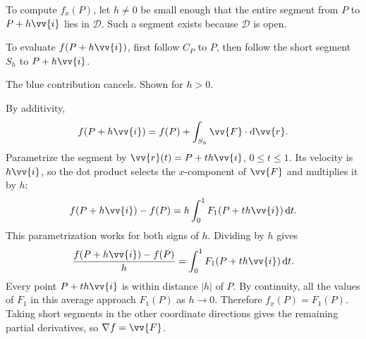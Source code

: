 \newpage
\noindent\begin{minipage}[c]{0.62\linewidth}
To compute $f_x(P)$, let $h \ne 0$ be small enough that the entire segment
from $P$ to $P + h\vv{i}$ lies in $\mathcal{D}$. Such a segment exists
because $\mathcal{D}$ is open.

To evaluate $f(P + h\vv{i})$, first follow
$C_P$ to $P$, then follow the short segment $S_h$ to $P + h\vv{i}$.
\end{minipage}\hfill
\begin{minipage}[c]{0.34\linewidth}
\centering\small
{}\par\smallskip
The blue contribution cancels. Shown for $h > 0$.
\end{minipage}\par

By additivity,
\[
    f(P + h\vv{i}) = f(P) + \int_{S_h}\vv{F}\cdot\dd{\vv{r}}.
\]
Parametrize the segment by $\vv{r}(t) = P + th\vv{i}$,
$0 \le t \le 1$. Its velocity is $h\vv{i}$, so the dot product
selects the $x$-component of $\vv{F}$ and multiplies it by $h$:
\[
    f(P + h\vv{i}) - f(P)
    = h\int_0^1 F_1(P + th\vv{i})\,\dd{t}.
\]
This parametrization works for both signs of $h$. Dividing by $h$ gives
\[
    \frac{f(P + h\vv{i}) - f(P)}{h}
    = \int_0^1 F_1(P + th\vv{i})\,\dd{t}.
\]
Every point $P + th\vv{i}$ is within distance $|h|$ of $P$. By continuity,
all the values of $F_1$ in this average approach $F_1(P)$ as $h \to 0$.
Therefore $f_x(P) = F_1(P)$. Taking short segments in the other
coordinate directions gives the remaining partial derivatives, so
$\nabla f = \vv{F}$.

